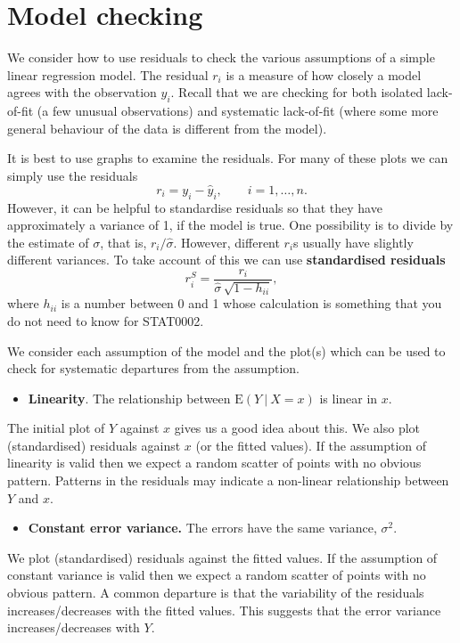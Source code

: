 \documentclass[
  british,
  11pt,
  openany, a4paper]{book}
\providecommand{\tightlist}{%
  \setlength{\itemsep}{0pt}\setlength{\parskip}{0pt}}
\begin{document}
\section{Model checking}\label{model-checking}

We consider how to use residuals to check the various assumptions of a simple linear regression model. The residual \(r_i\) is a measure of how closely a model agrees with the observation \(y_i\). Recall that we are checking for both isolated lack-of-fit (a few unusual observations) and systematic lack-of-fit (where some more general behaviour of the data is different from the model).

It is best to use graphs to examine the residuals. For many of these plots we can simply use the residuals
\[ r_i = y_i-\hat{y}_i, \qquad i=1,\ldots,n. \]
However, it can be helpful to standardise residuals so that they have approximately
a variance of 1, if the model is true. One possibility is to divide by the estimate of \(\sigma\), that is, \(r_i/\hat{\sigma}\).
However, different \(r_i\)s usually have slightly different variances. To take account of this we can use \textbf{standardised residuals}
\[ r^S_i = \frac{r_i}{\hat{\sigma}\,\sqrt{1-h_{ii}}}, \]
where \(h_{ii}\) is a number between 0 and 1 whose calculation is something that you do not need to know for STAT0002.

We consider each assumption of the model and the plot(s) which can be used to check for systematic departures from the assumption.

\begin{itemize}
\tightlist
\item
  \textbf{Linearity}. The relationship between \(\text{E}(Y~|~X=x)\) is linear in \(x\).
\end{itemize}

The initial plot of \(Y\) against \(x\) gives us a good idea about this. We also plot (standardised) residuals against \(x\) (or the fitted values). If the assumption of linearity is valid then we expect a random scatter of points with no obvious
pattern. Patterns in the residuals may indicate a non-linear relationship between
\(Y\) and \(x\).

\begin{itemize}
\tightlist
\item
  \textbf{Constant error variance.} The errors have the same variance, \(\sigma^2\).
\end{itemize}

We plot (standardised) residuals against the fitted values. If the assumption of constant variance is valid then we expect a random scatter of points with no obvious pattern. A common departure is that the variability of the residuals increases/decreases with the fitted values. This suggests that the error variance increases/decreases with \(Y\).
\end{document}
